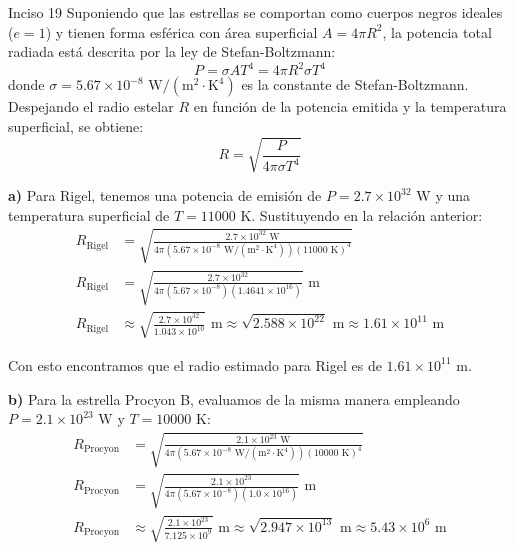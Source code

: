 \documentclass[11pt,letterpaper]{article}
\begin{document}
\begin{inciso}{Inciso 19}
\noindent Suponiendo que las estrellas se comportan como cuerpos negros ideales ($e = 1$) y tienen forma esférica con área superficial $A = 4\pi R^2$, la potencia total radiada está descrita por la ley de Stefan-Boltzmann:
\begin{equation*}
    P = \sigma A T^4 = 4\pi R^2 \sigma T^4
\end{equation*}
donde $\sigma = 5.67 \times 10^{-8}\text{ W}/(\text{m}^2\cdot\text{K}^4)$ es la constante de Stefan-Boltzmann. Despejando el radio estelar $R$ en función de la potencia emitida y la temperatura superficial, se obtiene:
\begin{equation*}
    R = \sqrt{\frac{P}{4\pi \sigma T^4}}
\end{equation*}

\vspace{0.5em}
\noindent \textbf{a)} Para Rigel, tenemos una potencia de emisión de $P = 2.7 \times 10^{32}\text{ W}$ y una temperatura superficial de $T = 11000\text{ K}$. Sustituyendo en la relación anterior:
\begin{align*}
    R_{\text{Rigel}} &= \sqrt{\frac{2.7 \times 10^{32}\text{ W}}{4\pi (5.67 \times 10^{-8}\text{ W}/(\text{m}^2\cdot\text{K}^4))(11000\text{ K})^4}} \\
    R_{\text{Rigel}} &= \sqrt{\frac{2.7 \times 10^{32}}{4\pi (5.67 \times 10^{-8})(1.4641 \times 10^{16})}}\text{ m} \\
    R_{\text{Rigel}} &\approx \sqrt{\frac{2.7 \times 10^{32}}{1.043 \times 10^{10}}}\text{ m} \approx \sqrt{2.588 \times 10^{22}}\text{ m} \approx 1.61 \times 10^{11}\text{ m}
\end{align*}

\noindent Con esto encontramos que el radio estimado para Rigel es de $1.61 \times 10^{11}\text{ m}$.

\vspace{0.8em}
\noindent \textbf{b)} Para la estrella Procyon B, evaluamos de la misma manera empleando $P = 2.1 \times 10^{23}\text{ W}$ y $T = 10000\text{ K}$:
\begin{align*}
    R_{\text{Procyon}} &= \sqrt{\frac{2.1 \times 10^{23}\text{ W}}{4\pi (5.67 \times 10^{-8}\text{ W}/(\text{m}^2\cdot\text{K}^4))(10000\text{ K})^4}} \\
    R_{\text{Procyon}} &= \sqrt{\frac{2.1 \times 10^{23}}{4\pi (5.67 \times 10^{-8})(1.0 \times 10^{16})}}\text{ m} \\
    R_{\text{Procyon}} &\approx \sqrt{\frac{2.1 \times 10^{23}}{7.125 \times 10^{9}}}\text{ m} \approx \sqrt{2.947 \times 10^{13}}\text{ m} \approx 5.43 \times 10^6\text{ m}
\end{align*}


\end{inciso}
\end{document}
